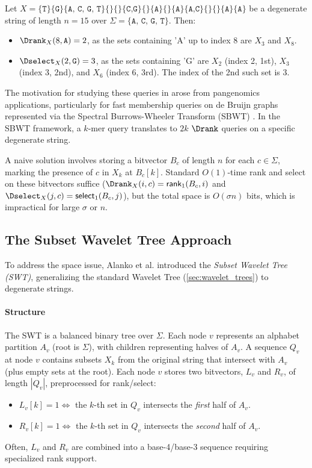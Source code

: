 \begin{example}
    Let $X = \{\texttt{T}\} \{\texttt{G}\} \{\texttt{A, C, G, T}\} \{\} \{\} \{\texttt{C,G}\} \{\} \{\texttt{A}\} \{\} \{\texttt{A}\} \{\texttt{A,C}\} \{\} \{\} \{\texttt{A}\} \{\texttt{A}\}$ be a degenerate string of length $n=15$ over $\Sigma = \{\texttt{A, C, G, T}\}$. Then:
    \begin{itemize}
        \item $\Drank_X(8, \texttt{A}) = 2$, as the sets containing 'A' up to index 8 are $X_3$ and $X_8$.
        \item $\Dselect_X(2, \texttt{G}) = 3$, as the sets containing 'G' are $X_2$ (index 2, 1st), $X_3$ (index 3, 2nd), and $X_6$ (index 6, 3rd). The index of the 2nd such set is 3.
    \end{itemize}
\end{example}

The motivation for studying these queries in \cite{SubsetWT} arose from pangenomics applications, particularly for fast membership queries on de Bruijn graphs represented via the Spectral Burrows-Wheeler Transform (SBWT) \cite{alanko2023small}. In the SBWT framework, a $k$-mer query translates to $2k$ $\Drank$ queries on a specific degenerate string.

A naive solution involves storing a bitvector $B_c$ of length $n$ for each $c \in \Sigma$, marking the presence of $c$ in $X_k$ at $B_c[k]$. Standard $O(1)$-time \textsf{rank} and \textsf{select} on these bitvectors suffice ($\Drank_X(i, c) = \textsf{rank}_1(B_c, i)$ and $\Dselect_X(j, c) = \textsf{select}_1(B_c, j)$), but the total space is $O(\sigma n)$ bits, which is impractical for large $\sigma$ or $n$.

\subsection{The Subset Wavelet Tree Approach}

To address the space issue, Alanko et al. \cite{SubsetWT} introduced the \emph{Subset Wavelet Tree (SWT)}, generalizing the standard Wavelet Tree (\autoref{sec:wavelet_trees}) to degenerate strings.

\paragraph{Structure} The SWT is a balanced binary tree over $\Sigma$. Each node $v$ represents an alphabet partition $A_v$ (root is $\Sigma$), with children representing halves of $A_v$. A sequence $Q_v$ at node $v$ contains subsets $X_k$ from the original string that intersect with $A_v$ (plus empty sets at the root). Each node $v$ stores two bitvectors, $L_v$ and $R_v$, of length $|Q_v|$, preprocessed for rank/select:
\begin{itemize}
    \item $L_v[k] = 1 \iff$ the $k$-th set in $Q_v$ intersects the \emph{first} half of $A_v$.
    \item $R_v[k] = 1 \iff$ the $k$-th set in $Q_v$ intersects the \emph{second} half of $A_v$.
\end{itemize}
Often, $L_v$ and $R_v$ are combined into a base-4/base-3 sequence requiring specialized rank support.

